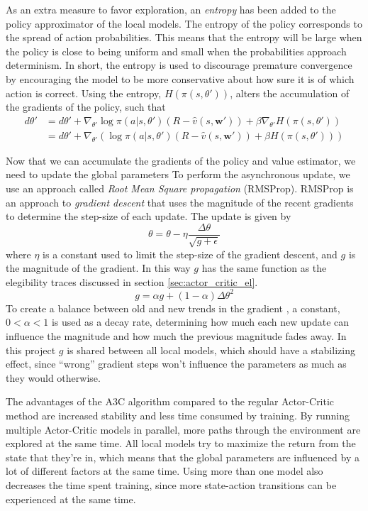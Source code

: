 \documentclass[11pt]{article}
\begin{document}
As an extra measure to favor exploration, an \textit{entropy} has been added
to the policy approximator of the local models.
The entropy of the policy corresponds to the spread of action probabilities.
This means that the entropy will be large when the policy is close to being
uniform and small when the probabilities approach determinism.
In short, the entropy is used to discourage premature convergence
by encouraging the model to be more conservative about how sure it is
of which action is correct.
Using the entropy, $H(\pi(s, \theta'))$, alters the accumulation of the gradients
of the policy, such that
\begin{equation}
    \begin{aligned}
        d\theta' & = d\theta' + \nabla_{\theta'} \log \pi(a|s, \theta')(R - \hat{v}(s, \mathbf{w}')) + \beta \nabla_{\theta'} H(\pi(s, \theta'))\\
                 & = d\theta' + \nabla_{\theta'} (\log \pi(a|s, \theta')(R - \hat{v}(s, \mathbf{w}')) + \beta H(\pi(s, \theta')))
    \end{aligned}
\end{equation}

Now that we can accumulate the gradients of the policy and value estimator, we need to update the
global parameters
To perform the asynchronous update, we use an approach called \textit{Root Mean Square propagation} (RMSProp).
RMSProp is an approach to \textit{gradient descent} 
that uses the magnitude of the recent gradients to
determine the step-size of each update.
The update is given by 
\begin{equation}
    \theta = \theta - \eta \frac{\Delta \theta}{\sqrt{g + \epsilon}}
\end{equation}
where $\eta$ is a constant used to limit the step-size of the gradient descent, and 
$g$ is the magnitude of the gradient.
In this way $g$ has the same function as the elegibility traces discussed in
section \ref{sec:actor_critic_el}.
\begin{equation}
    g = \alpha g + (1 - \alpha) \Delta \theta^2
\end{equation}
To create a balance between old and new trends in the gradient
, a constant, $0 < \alpha < 1$ is used as a decay rate,
determining how much each new update can influence the magnitude and how much the previous magnitude fades away.
In this project $g$ is shared between all local models, which should have a stabilizing
effect, since “wrong” gradient steps won't influence the parameters as much as
they would otherwise.

The advantages of the A3C algorithm compared to the regular Actor-Critic method
are increased stability and less time consumed by training.
By running multiple Actor-Critic models in parallel, more paths through the environment are explored
at the same time.
All local models try to maximize the return from the state that they're in, which means that
the global parameters are influenced by a lot of different factors at the same time.
Using more than one model also decreases the time spent training, since
more state-action transitions can be experienced at the same time.
\end{document}
